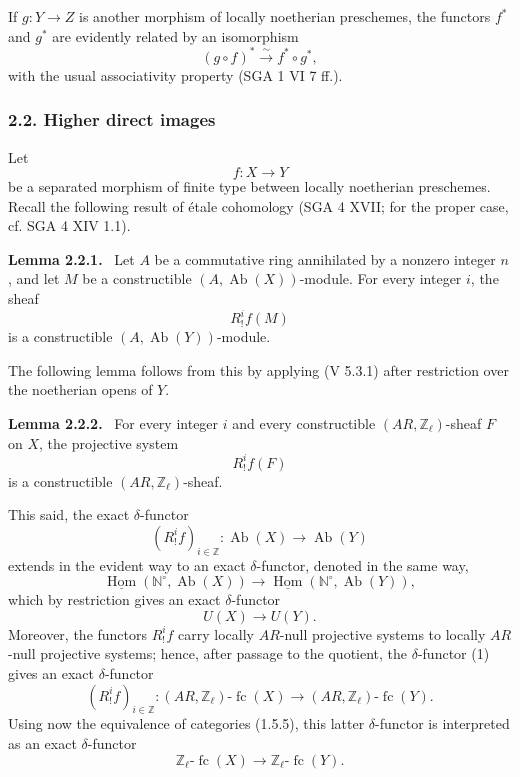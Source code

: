 \documentclass[11pt]{article}
\providecommand{\uHom}{\underline{\Hom}}
\newenvironment{statement}[1]{\par\medskip\noindent\textbf{#1.}\ }{\par\medskip}
\DeclareMathOperator{\Hom}{Hom}
\providecommand{\Hom}{\operatorname{Hom}}
\providecommand{\Ab}{\operatorname{Ab}}
\providecommand{\fc}{\operatorname{fc}}
\providecommand{\Ab}{\operatorname{Ab}}
\providecommand{\Hom}{\operatorname{Hom}}
\begin{document}
If \(g:Y\to Z\) is another morphism of locally noetherian preschemes, the functors \(f^*\) and \(g^*\) are evidently related by an isomorphism
\[
(g\circ f)^*\xrightarrow{\sim}f^*\circ g^*,
\]
with the usual associativity property (SGA 1 VI 7 ff.).

\subsubsection*{2.2. Higher direct images}

Let
\[
f:X\longrightarrow Y
\]
be a separated morphism of finite type between locally noetherian preschemes. Recall the following result of étale cohomology (SGA 4 XVII; for the proper case, cf. SGA 4 XIV 1.1).

\begin{statement}{Lemma 2.2.1}
Let \(A\) be a commutative ring annihilated by a nonzero integer \(n\), and let \(M\) be a constructible \((A,\Ab(X))\)-module. For every integer \(i\), the sheaf
\[
R^i_!f(M)
\]
is a constructible \((A,\Ab(Y))\)-module.
\end{statement}

The following lemma follows from this by applying (V 5.3.1) after restriction over the noetherian opens of \(Y\).

\begin{statement}{Lemma 2.2.2}
For every integer \(i\) and every constructible \((AR,\mathbb Z_\ell)\)-sheaf \(F\) on \(X\), the projective system
\[
R^i_!f(F)
\]
is a constructible \((AR,\mathbb Z_\ell)\)-sheaf.
\end{statement}

This said, the exact \(\delta\)-functor
\[
(R^i_!f)_{i\in\mathbb Z}:\Ab(X)\longrightarrow \Ab(Y)
\]
extends in the evident way to an exact \(\delta\)-functor, denoted in the same way,
\[
\uHom(\mathbb N^\circ,\Ab(X))\longrightarrow \uHom(\mathbb N^\circ,\Ab(Y)),
\]
which by restriction gives an exact \(\delta\)-functor
\[
U(X)\longrightarrow U(Y).
\tag{1}
\]
Moreover, the functors \(R^i_!f\) carry locally \(AR\)-null projective systems to locally \(AR\)-null projective systems; hence, after passage to the quotient, the \(\delta\)-functor (1) gives an exact \(\delta\)-functor
\[
(R^i_!f)_{i\in\mathbb Z}:(AR,\mathbb Z_\ell)\text{-}\fc(X)
\longrightarrow (AR,\mathbb Z_\ell)\text{-}\fc(Y).
\]
Using now the equivalence of categories (1.5.5), this latter \(\delta\)-functor is interpreted as an exact \(\delta\)-functor
\[
\mathbb Z_\ell\text{-}\fc(X)\longrightarrow \mathbb Z_\ell\text{-}\fc(Y).
\]
\end{document}
